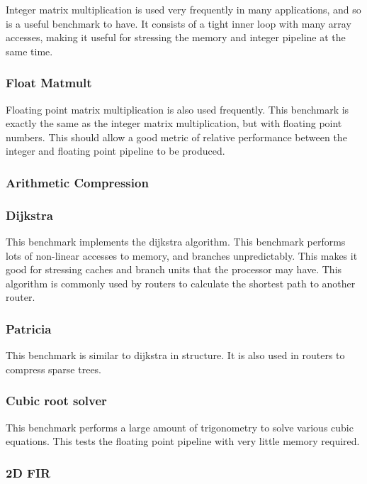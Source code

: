 \documentclass[twocolumn]{article}
\begin{document}
Integer matrix multiplication is used very frequently in many applications, and so is a useful benchmark to have. It consists of a tight inner loop with many array accesses, making it useful for stressing the memory and integer pipeline at the same time.

\subsubsection*{Float Matmult}

Floating point matrix multiplication is also used frequently. This benchmark is exactly the same as the integer matrix multiplication, but with floating point numbers. This should allow a good metric of relative performance between the integer and floating point pipeline to be produced.

\subsubsection*{Arithmetic Compression}

\subsubsection*{Dijkstra}

This benchmark implements the dijkstra algorithm. This benchmark performs lots of non-linear accesses to memory, and branches unpredictably. This makes it good for stressing caches and branch units that the processor may have. This algorithm is commonly used by routers to calculate the shortest path to another router.

\subsubsection*{Patricia}

This benchmark is similar to dijkstra in structure. It is also used in routers to compress sparse trees.

\subsubsection*{Cubic root solver}

This benchmark performs a large amount of trigonometry to solve various cubic equations. This tests the floating point pipeline with very little memory required.

\subsubsection*{2D FIR}
\end{document}
